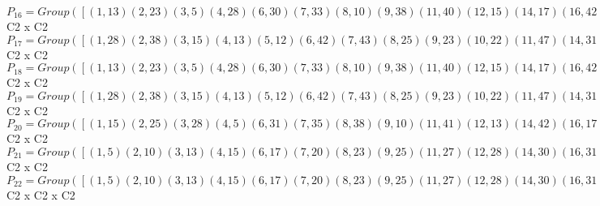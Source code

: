 \documentclass[varwidth=\maxdimen,border=10]{standalone}
\begin{document}
\begin{tabular}
$P_{16} = Group( [ ( 1,13)( 2,23)( 3, 5)( 4,28)( 6,30)( 7,33)( 8,10)( 9,38)(11,40)(12,15)(14,17)(16,42)(18,20)(19,43)(21,45)(22,25)(24,27)(26,47)(29,31)(32,35)(34,37)(36,48)(39,41)(44,46), ( 1,12)( 2,22)( 3, 4)( 5,28)( 6,29)( 7,32)( 8, 9)(10,38)(11,39)(13,15)(14,16)(17,42)(18,19)(20,43)(21,44)(23,25)(24,26)(27,47)(30,31)(33,35)(34,36)(37,48)(40,41)(45,46) ] )\cong$ C2 x C2\ \\
$P_{17} = Group( [ ( 1,28)( 2,38)( 3,15)( 4,13)( 5,12)( 6,42)( 7,43)( 8,25)( 9,23)(10,22)(11,47)(14,31)(16,30)(17,29)(18,35)(19,33)(20,32)(21,48)(24,41)(26,40)(27,39)(34,46)(36,45)(37,44), ( 1,30)( 2,40)( 3,17)( 4,42)( 5,14)( 6,13)( 7,45)( 8,27)( 9,47)(10,24)(11,23)(12,31)(15,29)(16,28)(18,37)(19,48)(20,34)(21,33)(22,41)(25,39)(26,38)(32,46)(35,44)(36,43) ] )\cong$ C2 x C2\ \\
$P_{18} = Group( [ ( 1,13)( 2,23)( 3, 5)( 4,28)( 6,30)( 7,33)( 8,10)( 9,38)(11,40)(12,15)(14,17)(16,42)(18,20)(19,43)(21,45)(22,25)(24,27)(26,47)(29,31)(32,35)(34,37)(36,48)(39,41)(44,46), ( 1,42)( 2,47)( 3,31)( 4,30)( 5,29)( 6,28)( 7,48)( 8,41)( 9,40)(10,39)(11,38)(12,17)(13,16)(14,15)(18,46)(19,45)(20,44)(21,43)(22,27)(23,26)(24,25)(32,37)(33,36)(34,35) ] )\cong$ C2 x C2\ \\
$P_{19} = Group( [ ( 1,28)( 2,38)( 3,15)( 4,13)( 5,12)( 6,42)( 7,43)( 8,25)( 9,23)(10,22)(11,47)(14,31)(16,30)(17,29)(18,35)(19,33)(20,32)(21,48)(24,41)(26,40)(27,39)(34,46)(36,45)(37,44), ( 1,31)( 2,41)( 3,42)( 4,17)( 5,16)( 6,15)( 7,46)( 8,47)( 9,27)(10,26)(11,25)(12,30)(13,29)(14,28)(18,48)(19,37)(20,36)(21,35)(22,40)(23,39)(24,38)(32,45)(33,44)(34,43) ] )\cong$ C2 x C2\ \\
$P_{20} = Group( [ ( 1,15)( 2,25)( 3,28)( 4, 5)( 6,31)( 7,35)( 8,38)( 9,10)(11,41)(12,13)(14,42)(16,17)(18,43)(19,20)(21,46)(22,23)(24,47)(26,27)(29,30)(32,33)(34,48)(36,37)(39,40)(44,45), ( 1,30)( 2,40)( 3,17)( 4,42)( 5,14)( 6,13)( 7,45)( 8,27)( 9,47)(10,24)(11,23)(12,31)(15,29)(16,28)(18,37)(19,48)(20,34)(21,33)(22,41)(25,39)(26,38)(32,46)(35,44)(36,43) ] )\cong$ C2 x C2\ \\
$P_{21} = Group( [ ( 1, 5)( 2,10)( 3,13)( 4,15)( 6,17)( 7,20)( 8,23)( 9,25)(11,27)(12,28)(14,30)(16,31)(18,33)(19,35)(21,37)(22,38)(24,40)(26,41)(29,42)(32,43)(34,45)(36,46)(39,47)(44,48), ( 1,17)( 2,27)( 3,30)( 4,31)( 5, 6)( 7,37)( 8,40)( 9,41)(10,11)(12,42)(13,14)(15,16)(18,45)(19,46)(20,21)(22,47)(23,24)(25,26)(28,29)(32,48)(33,34)(35,36)(38,39)(43,44) ] )\cong$ C2 x C2\ \\
$P_{22} = Group( [ ( 1, 5)( 2,10)( 3,13)( 4,15)( 6,17)( 7,20)( 8,23)( 9,25)(11,27)(12,28)(14,30)(16,31)(18,33)(19,35)(21,37)(22,38)(24,40)(26,41)(29,42)(32,43)(34,45)(36,46)(39,47)(44,48), ( 1,17)( 2,27)( 3,30)( 4,31)( 5, 6)( 7,37)( 8,40)( 9,41)(10,11)(12,42)(13,14)(15,16)(18,45)(19,46)(20,21)(22,47)(23,24)(25,26)(28,29)(32,48)(33,34)(35,36)(38,39)(43,44), ( 1,12)( 2,22)( 3, 4)( 5,28)( 6,29)( 7,32)( 8, 9)(10,38)(11,39)(13,15)(14,16)(17,42)(18,19)(20,43)(21,44)(23,25)(24,26)(27,47)(30,31)(33,35)(34,36)(37,48)(40,41)(45,46) ] )\cong$ C2 x C2 x C2\ \\

\end{tabular}
\end{document}
